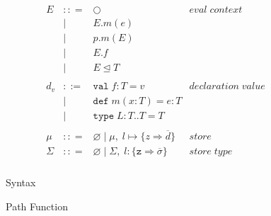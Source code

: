 \documentclass{llncs}
\begin{document}
\begin{figure}[h]
\[\begin{array}{lll}
\begin{array}{lllr}
&&\\
E & :: = & \bigcirc & eval \; context\\
       & | & E.m(e)\\
       & | & p.m(E)\\
       & | & E.f\\
       & | & E \unlhd T\\
&&\\
d_v & ::= & \texttt{val} \; f : T = v & declaration \; value \\
  & |   & \texttt{def} \; m(x:T) = e : T &\\
  & |   & \texttt{type} \; L : T .. T = T &\\
&&\\
\mu & :: = & \varnothing \; | \; \mu,\; l \mapsto \{z \Rightarrow \overline{d}\} & store \\
\Sigma & :: = & \varnothing \; | \; \Sigma,\; l : \{\texttt{z} \Rightarrow \overline{\sigma}\} & store \; type \\
\end{array}
\end{array}
\]
\caption{Syntax}
\label{f:syntax}
\end{figure}


\begin{figure}[h]
\caption{Path Function}
\label{f:path}
\end{figure}
\end{document}
